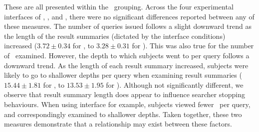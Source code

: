 These are all presented within the ~grouping. Across the four experimental interfaces of , ,  and , there were no significant differences reported between any of these measures. The number of queries issued follows a slight downward trend as the length of the result summaries (dictated by the interface conditions) increased ($3.72 \pm 0.34$ for , to $3.28\pm0.31$ for ). This was also true for the number of~ examined. However, the depth to which subjects went to per query follows a downward trend. As the length of each result summary increased, subjects were likely to go to shallower depths per query when examining result summaries ($15.44\pm1.81$ for , to $13.53\pm1.95$ for ). Although not significantly different, we observe that result summary length does appear to influence searcher stopping behaviours. When using interface  for example, subjects viewed fewer~ per query, and correspondingly examined to shallower depths. Taken together, these two measures demonstrate that a relationship may exist between these factors.

